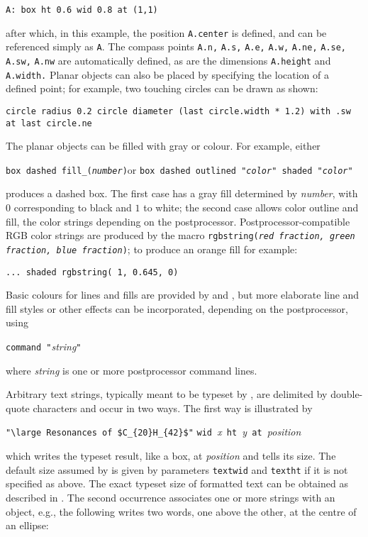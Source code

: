 {\tt A: box ht 0.6 wid 0.8 at (1,1)}

\noindent
after which, in this example, the position {\tt A.center} is defined,
and can be referenced simply as {\tt A}.
The compass points {\tt A.n,} {\tt A.s,} {\tt A.e,} {\tt A.w,} {\tt A.ne,}
{\tt A.se,} {\tt A.sw,} {\tt A.nw} are automatically defined, as are
the dimensions {\tt A.height} and {\tt A.width.}
Planar objects can also be placed by specifying the location of a defined
point; for example, two touching circles can be drawn as shown:

{\tt circle radius 0.2\hfill\break 
\hspace*{\parindent}%
circle diameter (last circle.width * 1.2) with .sw at last circle.ne}

The planar objects can be filled with gray or colour.
For example, either

{\tt box dashed fill\_({\sl number})}\quad or\quad
 {\tt box dashed outlined "{\sl color}" shaded "{\sl color}"}

\noindent
produces a dashed box. The first case has a gray fill determined by
{\sl number}, with $0$ corresponding to black and $1$ to white;
the second case allows color outline and fill, the color strings depending on
the postprocessor.
Postprocessor-compatible RGB color strings are produced by the macro
{\tt rgbstring({\sl red fraction, green fraction, blue fraction})};
to produce an orange fill for example:

{\tt ... shaded rgbstring( 1, 0.645, 0)}

Basic colours for lines and fills are provided by \gpic  and \dpic,
but more elaborate line and fill styles or other effects
can be incorporated, depending on the postprocessor, using

{\tt command "}{\sl string}{\tt "}

\noindent where {\sl string} is one or more postprocessor command lines.

Arbitrary text strings, typically meant to be typeset by \latex, are
delimited by double-quote characters and occur in two ways.  The first
way is illustrated by

\verb|"\large Resonances of $C_{20}H_{42}$"|
 \verb|wid |{\sl x}\verb| ht |{\sl y}\verb| at |{\sl position}

\noindent
which writes the typeset result, like a box, at {\sl position} and tells
\pic its size.  The default size assumed by \pic is given by parameters
{\tt textwid} and {\tt textht} if it is not specified as above.
The exact typeset size of formatted text can be obtained
as described in .  The second occurrence
associates one or more strings with an object, e.g., the following writes
two words, one above the other, at the centre of an ellipse:

